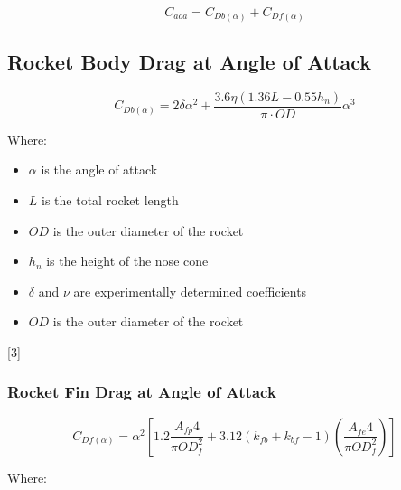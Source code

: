 \documentclass[]{book}
\providecommand{\tightlist}{%
  \setlength{\itemsep}{0pt}\setlength{\parskip}{0pt}}
\begin{document}
\begin{equation}
\label{eq_rocket_drag_aoa}
C_{aoa} = C_{Db(\alpha)} + C_{Df(\alpha)}
\end{equation}

\subsection{Rocket Body Drag at Angle of
Attack}\label{rocket-body-drag-at-angle-of-attack}

\begin{equation}
\label{eq_rocket_body_drag_aoa}
C_{Db(\alpha)} = 2 \delta \alpha^2 + \dfrac{3.6 \eta (1.36 L - 0.55 h_n ) }{ \pi \cdot OD } \alpha^3
\end{equation}

Where:

\begin{itemize}
\tightlist
\item
  \(\alpha\) is the angle of attack
\item
  \(L\) is the total rocket length
\item
  \(OD\) is the outer diameter of the rocket
\item
  \(h_n\) is the height of the nose cone
\item
  \(\delta\) and \(\nu\) are experimentally determined coefficients
\item
  \(OD\) is the outer diameter of the rocket
\end{itemize}

{[}3{]}

\subsubsection{Rocket Fin Drag at Angle of
Attack}\label{rocket-fin-drag-at-angle-of-attack}

\begin{equation}
\label{eq_rocket_fin_drag_aoa}
C_{Df(\alpha)} = \alpha^2 \left[ 1.2 \dfrac{A_{fp}4}{\pi OD^2_f} + 3.12 (k_{fb} + k_{bf} - 1) \left( \dfrac{A_{fe} 4}{\pi OD^2_f} \right) \right]
\end{equation}

Where:
\end{document}
